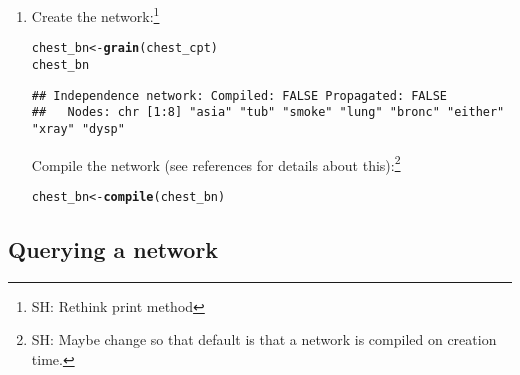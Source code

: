 \documentclass[10pt]{article}\usepackage[]{graphicx}\usepackage[]{color}
\makeatletter
\newcommand{\hlstd}[1]{\textcolor[rgb]{0.345,0.345,0.345}{#1}}%
\newcommand{\hlkwb}[1]{\textcolor[rgb]{0.69,0.353,0.396}{#1}}%
\newcommand{\hlkwd}[1]{\textcolor[rgb]{0.737,0.353,0.396}{\textbf{#1}}}%
\newenvironment{kframe}{%
 \def\at@end@of@kframe{}%
 \ifinner\ifhmode%
  \def\at@end@of@kframe{\end{minipage}}%
  \begin{minipage}{\columnwidth}%
 \fi\fi%
 \def\FrameCommand##1{\hskip\@totalleftmargin \hskip-\fboxsep
 \colorbox{shadecolor}{##1}\hskip-\fboxsep
     \hskip-\linewidth \hskip-\@totalleftmargin \hskip\columnwidth}%
 \MakeFramed {\advance\hsize-\width
   \@totalleftmargin\z@ \linewidth\hsize
   \@setminipage}}%
 {\par\unskip\endMakeFramed%
 \at@end@of@kframe}
\newenvironment{knitrout}{}{} %
\makeatother
\begin{document}
\begin{enumerate}
\item Create the network:\footnote{SH: Rethink print method}
\begin{knitrout}
\color{fgcolor}\begin{kframe}
\begin{alltt}
\hlstd{chest_bn} \hlkwb{<-} \hlkwd{grain}\hlstd{(chest_cpt)}
\hlstd{chest_bn}
\end{alltt}
\begin{verbatim}
## Independence network: Compiled: FALSE Propagated: FALSE 
##   Nodes: chr [1:8] "asia" "tub" "smoke" "lung" "bronc" "either" "xray" "dysp"
\end{verbatim}
\end{kframe}
\end{knitrout}

Compile the network (see references for details about
this):\footnote{SH: Maybe change so that default is that a network is
  compiled on creation time.}

\begin{knitrout}
\color{fgcolor}\begin{kframe}
\begin{alltt}
\hlstd{chest_bn} \hlkwb{<-} \hlkwd{compile}\hlstd{(chest_bn)}
\end{alltt}
\end{kframe}
\end{knitrout}

\end{enumerate}

\subsection{Querying a network}
\label{sec:querying-network}
\end{document}
